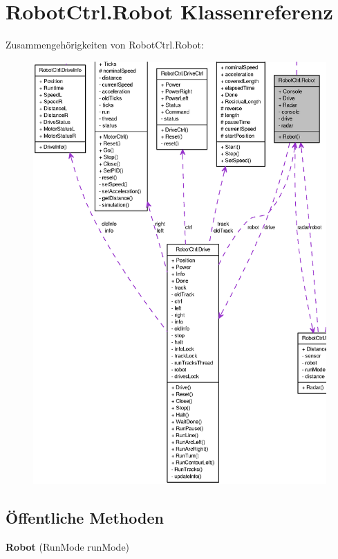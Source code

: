 \hypertarget{class_robot_ctrl_1_1_robot}{
\section{RobotCtrl.Robot Klassenreferenz}
\label{class_robot_ctrl_1_1_robot}
}


Zusammengehörigkeiten von RobotCtrl.Robot:\nopagebreak
\begin{figure}[H]
\begin{center}
\leavevmode
\includegraphics[width=400pt]{class_robot_ctrl_1_1_robot__coll__graph}
\end{center}
\end{figure}
\subsection*{Öffentliche Methoden}
\begin{DoxyCompactItemize}
\item 
\hypertarget{class_robot_ctrl_1_1_robot_acdd921df41328916b058eaad84ed3078}{
{\bfseries Robot} (RunMode runMode)}
\label{class_robot_ctrl_1_1_robot_acdd921df41328916b058eaad84ed3078}

\end{DoxyCompactItemize}

